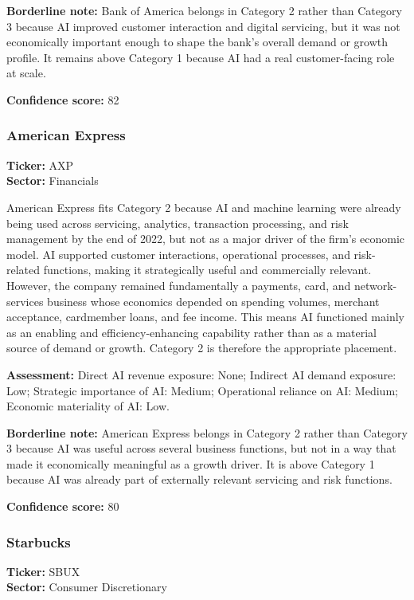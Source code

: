 \documentclass{article}
\begin{document}
\textbf{Borderline note:} Bank of America belongs in Category 2 rather than Category 3 because AI improved customer interaction and digital servicing, but it was not economically important enough to shape the bank’s overall demand or growth profile. It remains above Category 1 because AI had a real customer-facing role at scale.

\textbf{Confidence score:} 82

\subsubsection*{American Express}
\textbf{Ticker:} AXP \\
\textbf{Sector:} Financials

American Express fits Category 2 because AI and machine learning were already being used across servicing, analytics, transaction processing, and risk management by the end of 2022, but not as a major driver of the firm’s economic model. AI supported customer interactions, operational processes, and risk-related functions, making it strategically useful and commercially relevant. However, the company remained fundamentally a payments, card, and network-services business whose economics depended on spending volumes, merchant acceptance, cardmember loans, and fee income. This means AI functioned mainly as an enabling and efficiency-enhancing capability rather than as a material source of demand or growth. Category 2 is therefore the appropriate placement.

\textbf{Assessment:} Direct AI revenue exposure: None; Indirect AI demand exposure: Low; Strategic importance of AI: Medium; Operational reliance on AI: Medium; Economic materiality of AI: Low.

\textbf{Borderline note:} American Express belongs in Category 2 rather than Category 3 because AI was useful across several business functions, but not in a way that made it economically meaningful as a growth driver. It is above Category 1 because AI was already part of externally relevant servicing and risk functions.

\textbf{Confidence score:} 80

\subsubsection*{Starbucks}
\textbf{Ticker:} SBUX \\
\textbf{Sector:} Consumer Discretionary
\end{document}

